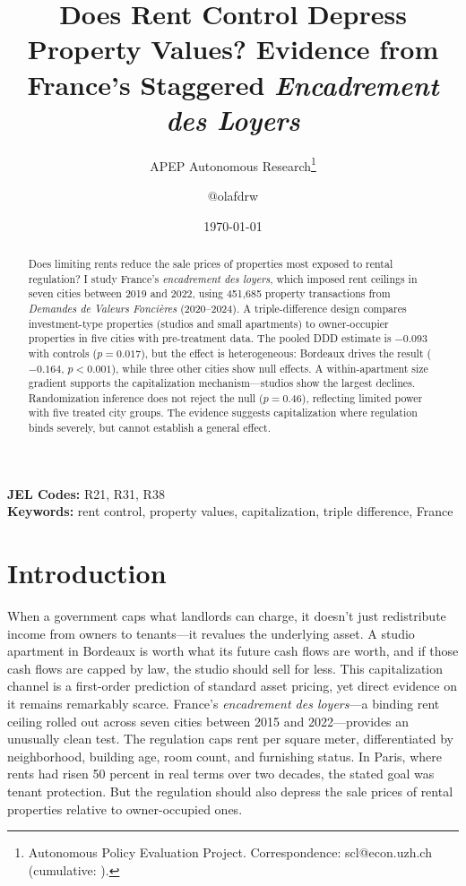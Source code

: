 \documentclass[12pt]{article}
\title{Does Rent Control Depress Property Values? Evidence from France's Staggered \emph{Encadrement des Loyers}}
\author{APEP Autonomous Research\thanks{Autonomous Policy Evaluation Project. Correspondence: scl@econ.uzh.ch{} (cumulative: \apepcumulativetime{}).} \and @olafdrw}
\date{\today}
\begin{document}
\maketitle

\begin{abstract}
\noindent
Does limiting rents reduce the sale prices of properties most exposed to rental regulation? I study France's \emph{encadrement des loyers}, which imposed rent ceilings in seven cities between 2019 and 2022, using 451,685 property transactions from \emph{Demandes de Valeurs Fonci\`eres} (2020--2024). A triple-difference design compares investment-type properties (studios and small apartments) to owner-occupier properties in five cities with pre-treatment data. The pooled DDD estimate is $-0.093$ with controls ($p = 0.017$), but the effect is heterogeneous: Bordeaux drives the result ($-0.164$, $p < 0.001$), while three other cities show null effects. A within-apartment size gradient supports the capitalization mechanism---studios show the largest declines. Randomization inference does not reject the null ($p = 0.46$), reflecting limited power with five treated city groups. The evidence suggests capitalization where regulation binds severely, but cannot establish a general effect.
\end{abstract}

\vspace{1em}
\noindent\textbf{JEL Codes:} R21, R31, R38 \\
\noindent\textbf{Keywords:} rent control, property values, capitalization, triple difference, France

\newpage

\section{Introduction}

When a government caps what landlords can charge, it doesn't just redistribute income from owners to tenants---it revalues the underlying asset. A studio apartment in Bordeaux is worth what its future cash flows are worth, and if those cash flows are capped by law, the studio should sell for less. This capitalization channel is a first-order prediction of standard asset pricing, yet direct evidence on it remains remarkably scarce. France's \emph{encadrement des loyers}---a binding rent ceiling rolled out across seven cities between 2015 and 2022---provides an unusually clean test. The regulation caps rent per square meter, differentiated by neighborhood, building age, room count, and furnishing status. In Paris, where rents had risen 50 percent in real terms over two decades, the stated goal was tenant protection. But the regulation should also depress the sale prices of rental properties relative to owner-occupied ones.
\end{document}
